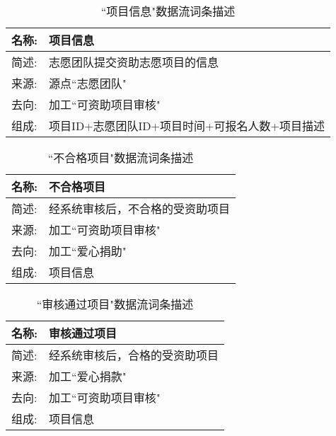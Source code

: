 \begin{table}[H]  
\caption{``项目信息"数据流词条描述}  
\begin{center}  
    \begin{tabular}{l p{11cm}} 
        \hline
        \quad 名称:  &   项目信息 \\
        \hline
        \quad 简述:  & 志愿团队提交资助志愿项目的信息 \\
        \hline
        \quad 来源:  & 源点``志愿团队" \\
        \hline
        \quad 去向:  & 加工``可资助项目审核" \\
        \hline
        \quad 组成:  & 项目ID+志愿团队ID+项目时间+可报名人数+项目描述 \\
        \hline
    \end{tabular}
    \label{tab1}
\end{center}
\end{table}


\begin{table}[H]  
\caption{``不合格项目"数据流词条描述}  
\begin{center}  
    \begin{tabular}{l p{11cm}} 
        \hline
        \quad 名称:  &  不合格项目 \\
        \hline
        \quad 简述:  & 经系统审核后，不合格的受资助项目 \\
        \hline
        \quad 来源:  & 加工``可资助项目审核"\\
        \hline
        \quad 去向:  & 加工``爱心捐助" \\
        \hline
        \quad 组成:  & 项目信息  \\
        \hline
    \end{tabular}
    \label{tab1}
\end{center}
\end{table}

\begin{table}[H]  
\caption{``审核通过项目"数据流词条描述}  
\begin{center}  
    \begin{tabular}{l p{11cm}} 
        \hline
        \quad 名称:  &   审核通过项目 \\
        \hline
        \quad 简述:  & 经系统审核后，合格的受资助项目 \\
        \hline
        \quad 来源:  & 加工``爱心捐款" \\
        \hline
        \quad 去向:  & 加工``可资助项目审核" \\
        \hline
        \quad 组成:  & 项目信息  \\
        \hline
    \end{tabular}
    \label{tab1}
\end{center}
\end{table}

